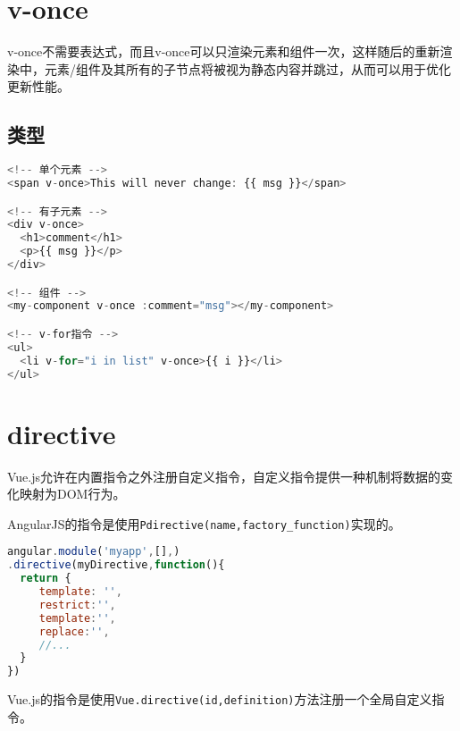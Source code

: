 \begin{lstlisting}[language=JavaScript]

\end{lstlisting}




\begin{lstlisting}[language=JavaScript]

\end{lstlisting}




\begin{lstlisting}[language=JavaScript]

\end{lstlisting}

\section{v-once}

v-once不需要表达式，而且v-once可以只渲染元素和组件一次，这样随后的重新渲染中，元素/组件及其所有的子节点将被视为静态内容并跳过，从而可以用于优化更新性能。

\subsection{类型}


\begin{lstlisting}[language=JavaScript]
<!-- 单个元素 -->
<span v-once>This will never change: {{ msg }}</span>

<!-- 有子元素 -->
<div v-once>
  <h1>comment</h1>
  <p>{{ msg }}</p>
</div>

<!-- 组件 -->
<my-component v-once :comment="msg"></my-component>

<!-- v-for指令 -->
<ul>
  <li v-for="i in list" v-once>{{ i }}</li>
</ul>
\end{lstlisting}

\section{directive}


Vue.js允许在内置指令之外注册自定义指令，自定义指令提供一种机制将数据的变化映射为DOM行为。


\begin{compactitem}
\item AngularJS的指令是使用\texttt{Pdirective(name,factory\_function)}实现的。



\begin{lstlisting}[language=JavaScript]
angular.module('myapp',[],)
.directive(myDirective,function(){
  return {
     template: '',
     restrict:'',
     template:'',
     replace:'',
     //...
  }
})
\end{lstlisting}

\item Vue.js的指令是使用\texttt{Vue.directive(id,definition)}方法注册一个全局自定义指令。

\end{compactitem}

